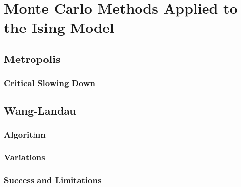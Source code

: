 \chapter{Monte Carlo Methods Applied to the Ising Model}

\section{Metropolis}

\subsection{Critical Slowing Down}


\section{Wang-Landau}

\subsection{Algorithm}

\subsection{Variations}

\subsection{Success and Limitations}
